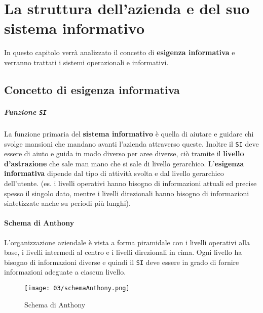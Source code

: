 \chapter[Struttura aziendale e del suo \texttt{SI}]{La struttura dell’azienda e del suo sistema informativo}
\thispagestyle{chapterInit}
In questo capitolo verrà analizzato il concetto di \textbf{esigenza informativa} e verranno trattati i sistemi operazionali e informativi.
\section{Concetto di esigenza informativa}
    \paragraph{Funzione \texttt{SI}} La funzione primaria del \textbf{sistema informativo} è quella di aiutare e guidare chi svolge mansioni che mandano avanti l'azienda attraverso queste. Inoltre il \texttt{SI} deve essere di aiuto e guida in modo diverso per aree diverse, ciò tramite il \textbf{livello d'astrazione} che sale man mano che si sale di livello gerarchico. L'\textbf{esigenza informativa} dipende dal tipo di attività svolta e dal livello gerarchico dell'utente. (es. i livelli operativi hanno bisogno di informazioni attuali ed precise spesso il singolo dato, mentre i livelli direzionali hanno bisogno di informazioni sintetizzate anche su periodi più lunghi).
    \subsubsection{Schema di Anthony}
        \label{subsec:schemaAnthony}
        L'organizzazione aziendale è vista a forma piramidale con i livelli operativi alla base, i livelli intermedi al centro e i livelli direzionali in cima. Ogni livello ha bisogno di informazioni diverse e quindi il \texttt{SI} deve essere in grado di fornire informazioni adeguate a ciascun livello.
        \begin{figure}[H]
            \centering
            \texttt{[image: 03/schemaAnthony.png]}
            \caption{Schema di Anthony}
        \end{figure}
